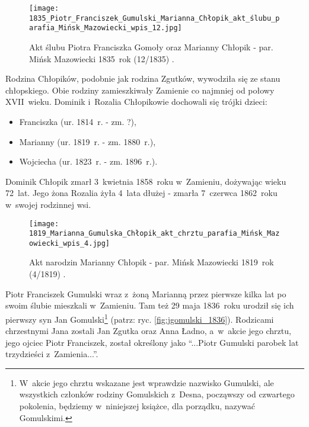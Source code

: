 \begin{figure}[!ht]
    \vspace*{0.5cm}
    \centering \texttt{[image: 
        1835\_Piotr\_Franciszek\_Gumulski\_Marianna\_Chłopik\_akt\_ślubu\_parafia\_Mińsk\_Mazowiecki\_wpis\_12.jpg]}
    \captionsetup{format=hang}
    \caption{Akt ślubu Piotra Franciszka Gomoły oraz Marianny Chłopik - 
    par. Mińsk Mazowiecki 1835~rok (12/1835) \cite{par_minsk2}.}
    \label{fig:pfgumulski_1835}
\end{figure}

Rodzina Chłopików, podobnie jak rodzina Zgutków, wywodziła się ze stanu 
chłopskiego. Obie rodziny zamieszkiwały Zamienie co najmniej od połowy 
XVII~wieku. Dominik i~Rozalia Chłopikowie dochowali się trójki dzieci:

\begin{itemize}
    \item Franciszka (ur. 1814~r. - zm. ?),
    \item Marianny (ur. 1819~r. - zm. 1880~r.),
    \item Wojciecha (ur. 1823~r. - zm. 1896~r.).
\end{itemize}

Dominik Chłopik zmarł 3~kwietnia 1858~roku w~Zamieniu, dożywając wieku 
72~lat. Jego żona Rozalia żyła 4~lata dłużej - zmarła 7~czerwca 1862~roku 
w~swojej rodzinnej wsi.

\begin{figure}[!ht]
    \vspace*{0.5cm}
    \centering \texttt{[image: 
        1819\_Marianna\_Gumulska\_Chłopik\_akt\_chrztu\_parafia\_Mińsk\_Mazowiecki\_wpis\_4.jpg]}
    \captionsetup{format=hang}
    \caption{Akt narodzin Marianny Chłopik - par. Mińsk Mazowiecki 1819~rok 
    (4/1819) \cite{par_minsk1}.}
    \label{fig:mchlopik_1819}
\end{figure}

Piotr Franciszek Gumulski wraz z~żoną Marianną przez pierwsze kilka lat po 
swoim ślubie mieszkali w~Zamieniu. Tam też 29 maja 1836~roku urodził się ich 
pierwszy syn Jan Gomulski\footnote{W~akcie jego chrztu wskazane jest 
wprawdzie nazwisko Gumulski, ale wszystkich członków rodziny Gomulskich 
z~Desna, począwszy od czwartego pokolenia, będziemy w~niniejszej książce, dla 
porządku, nazywać Gomulskimi.} (patrz: ryc. \ref{fig:jgomulski_1836}). 
Rodzicami chrzestnymi Jana zostali Jan Zgutka oraz Anna Ładno, a~w~akcie jego 
chrztu, jego ojciec Piotr Franciszek, został określony jako \enquote{...Piotr 
Gumulski parobek lat trzydzieści z~Zamienia...}.

